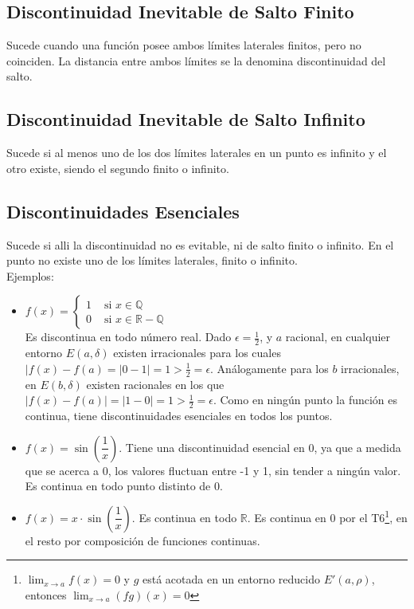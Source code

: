 \documentclass[11pt,a4paper]{article}
\begin{document}
\subsection{Discontinuidad Inevitable de Salto Finito}
Sucede cuando una funci\'on posee ambos l\'imites laterales finitos, pero no coinciden. La distancia entre ambos l\'imites se la denomina discontinuidad del salto.
\subsection{Discontinuidad Inevitable de Salto Infinito}
Sucede si al menos uno de los dos l\'imites laterales en un punto es infinito y el otro existe, siendo el segundo finito o infinito.
\subsection{Discontinuidades Esenciales}
Sucede si alli la discontinuidad no es evitable, ni de salto finito o infinito. En el punto no existe uno de los l\'imites laterales, finito o infinito.\\
Ejemplos: 
\begin{itemize}
\item $f(x)=\left\{\begin{array}{ll} 1 & \text{ si } x \in \mathbb{Q} \\ 0 & \text{ si } x \in \mathbb{R - Q}\end{array}\right.$ \\ Es discontinua en todo n\'umero real. Dado $\epsilon = \frac{1}{2}$, y $a$ racional, en cualquier entorno $E(a,\delta)$ existen irracionales para los cuales $|f(x)-f(a) = |0-1| = 1 > \frac{1}{2} = \epsilon$. An\'alogamente para los $b$ irracionales, en $E(b,\delta)$ existen racionales en los que $|f(x)-f(a)| = |1-0| = 1 > \frac{1}{2} = \epsilon$. Como en ning\'un punto la funci\'on es continua, tiene discontinuidades esenciales en todos los puntos.
\item $f(x)=\sin\left(\dfrac{1}{x}\right)$. Tiene una discontinuidad esencial en $0$, ya que a medida que se acerca a $0$, los valores fluctuan entre -1 y 1, sin tender a ning\'un valor. Es continua en todo punto distinto de 0.
\item $f(x)=x\cdot\sin\left(\dfrac{1}{x}\right)$. Es continua en todo $\mathbb{R}$. Es continua en 0 por el T6\footnote{$\displaystyle{\lim_{x\to a}f(x) = 0}$ y $g$ est\'a acotada en un entorno reducido $E'(a,\rho)$, entonces $\displaystyle{\lim_{x\to a}(fg)(x) = 0}$}, en el resto por composici\'on de funciones continuas.
\end{itemize}
\end{document}
